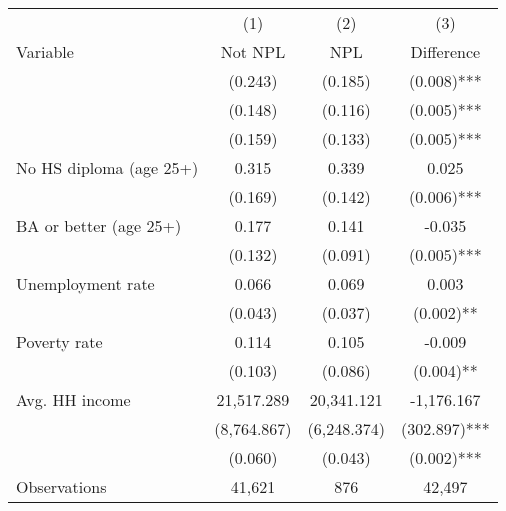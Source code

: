 \begin{tabular}{lccc}
\hline\hline
 & (1) & (2) & (3)   \\
Variable & Not NPL & NPL & Difference   \\
\hline
&(0.243)&(0.185)&(0.008)***\\
&(0.148)&(0.116)&(0.005)***\\
&(0.159)&(0.133)&(0.005)***\\
No HS diploma (age 25+)&0.315&0.339&0.025\\
&(0.169)&(0.142)&(0.006)***\\
BA or better (age 25+)&0.177&0.141&-0.035\\
&(0.132)&(0.091)&(0.005)***\\
Unemployment rate&0.066&0.069&0.003\\
&(0.043)&(0.037)&(0.002)**\\
Poverty rate&0.114&0.105&-0.009\\
&(0.103)&(0.086)&(0.004)**\\
Avg. HH income&21,517.289&20,341.121&-1,176.167\\
&(8,764.867)&(6,248.374)&(302.897)***\\
&(0.060)&(0.043)&(0.002)***\\
\hline
Observations & 41,621 & 876 & 42,497  \\
\hline\hline
\end{tabular}
